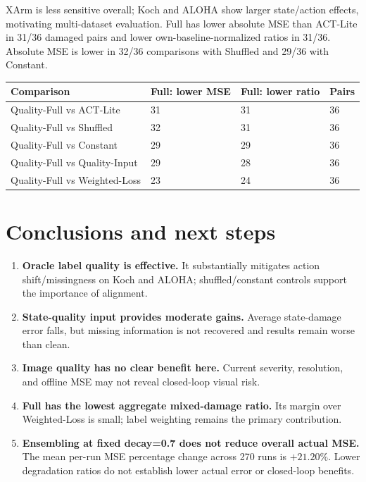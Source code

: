 \documentclass[11pt,a4paper]{article}
\begin{document}
XArm is less sensitive overall; Koch and ALOHA show larger state/action effects, motivating multi-dataset evaluation. Full has lower absolute MSE than ACT-Lite in 31/36 damaged pairs and lower own-baseline-normalized ratios in 31/36. Absolute MSE is lower in 32/36 comparisons with Shuffled and 29/36 with Constant.

\begin{table}[htbp]
\centering
\small
\begin{tabularx}{\linewidth}{Y C{29mm} C{29mm} C{24mm}}
\toprule
Comparison & Full: lower MSE & Full: lower ratio & Pairs\\
\midrule
Quality-Full vs ACT-Lite & 31 & 31 & 36\\
Quality-Full vs Shuffled & 32 & 31 & 36\\
Quality-Full vs Constant & 29 & 29 & 36\\
Quality-Full vs Quality-Input & 29 & 28 & 36\\
Quality-Full vs Weighted-Loss & 23 & 24 & 36\\
\bottomrule
\end{tabularx}
\end{table}

\clearpage
\section{Conclusions and next steps}

\begin{tcolorbox}[colback=panel,colframe=teal,boxrule=0.8pt,arc=1.5mm,title={\color{navy}\bfseries Main findings}]
\begin{enumerate}
\item \textbf{Oracle label quality is effective.} It substantially mitigates action shift/missingness on Koch and ALOHA; shuffled/constant controls support the importance of alignment.
\item \textbf{State-quality input provides moderate gains.} Average state-damage error falls, but missing information is not recovered and results remain worse than clean.
\item \textbf{Image quality has no clear benefit here.} Current severity, resolution, and offline MSE may not reveal closed-loop visual risk.
\item \textbf{Full has the lowest aggregate mixed-damage ratio.} Its margin over Weighted-Loss is small; label weighting remains the primary contribution.
\item \textbf{Ensembling at fixed decay=0.7 does not reduce overall actual MSE.} The mean per-run MSE percentage change across 270 runs is $+21.20\%$. Lower degradation ratios do not establish lower actual error or closed-loop benefits.
\end{enumerate}
\end{tcolorbox}
\end{document}
